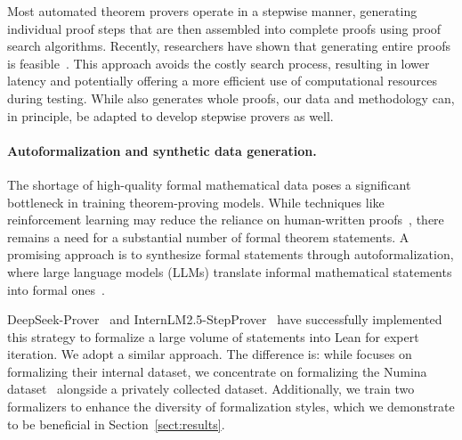 Most automated theorem provers operate in a stepwise manner, generating individual proof steps that are then assembled into complete proofs using proof search algorithms. Recently, researchers have shown that generating entire proofs is feasible~\citep{first2023baldur,xin2024deepseek,wang2024theoremllama}. This approach avoids the costly search process, resulting in lower latency and potentially offering a more efficient use of computational resources during testing. While {\prover} also generates whole proofs, our data and methodology can, in principle, be adapted to develop stepwise provers as well.


\paragraph{Autoformalization and synthetic data generation.} 
The shortage of high-quality formal mathematical data poses a significant bottleneck in training theorem-proving models. While techniques like reinforcement learning may reduce the reliance on human-written proofs~\citep{alphaproof}, there remains a need for a substantial number of formal theorem statements. A promising approach is to synthesize formal statements through autoformalization, where large language models (LLMs) translate informal mathematical statements into formal ones~\citep{wu2022autoformalization,wu2024internlm2,xin2024deepseek,xin2024deepseekv15}. 

DeepSeek-Prover~\citep{xin2024deepseek} and InternLM2.5-StepProver~\citep{wu2024internlm2} have successfully implemented this strategy to formalize a large volume of statements into Lean for expert iteration. We adopt a similar approach. The difference is: while \citet{liu2024deepseek} focuses on formalizing their internal dataset, we concentrate on formalizing the Numina dataset~\citep{li2024numinamath} alongside a privately collected dataset. Additionally, we train two formalizers to enhance the diversity of formalization styles, which we demonstrate to be beneficial in Section~\ref{sect:results}. %



